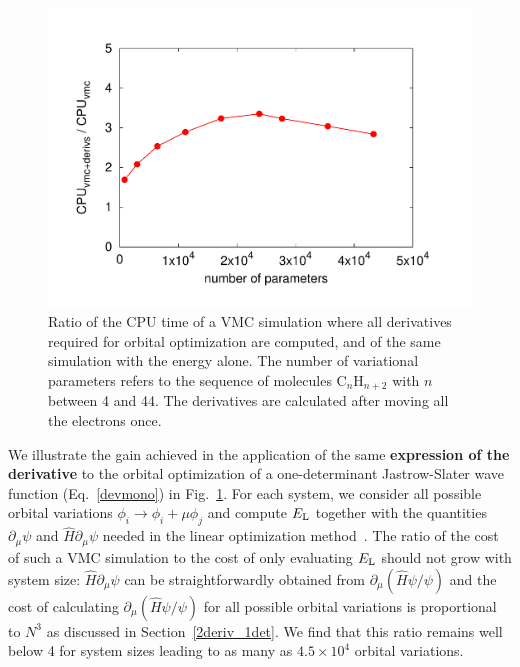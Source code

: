 \documentclass[aip,jcp,reprint,floatfix,onecolumn]{revtex4-1}
\begin{document}
\begin{figure}[h]
\includegraphics[width=\columnwidth]{aorb.pdf}
\caption{
Ratio of the CPU time of a VMC simulation where all derivatives required for orbital optimization are computed,
and of the same simulation with the energy alone. The number of variational parameters refers to the sequence of
molecules C$_n$H$_{n+2}$ with $n$ between 4 and 44. The derivatives are calculated after moving all the electrons once.
}
\label{orb_a}
\end{figure}

We illustrate the gain achieved in the application of the same %
{\bf expression of the derivative}  to the orbital optimization of a one-determinant
Jastrow-Slater wave function (Eq.~\ref{devmono}) in Fig.~\ref{orb_a}. For each system, we consider all possible orbital variations
$\phi_i \to \phi_i+\mu\phi_j$ and compute $E_{\rm L}$ together with the quantities $\partial_\mu\psi$ and
$\hat{H}\partial_\mu \psi$ needed in the linear optimization method~\cite{Umrigar07}.  The ratio of the cost of such a VMC simulation
to the cost of only evaluating $E_{\rm L}$ should not grow with system size: $\hat{H}\partial_\mu \psi$ can be straightforwardly
obtained from $\partial_\mu (\hat{H}\psi/\psi)$ and the cost of calculating $\partial_\mu (\hat{H}\psi/\psi)$ for all possible orbital
variations is proportional to $N^3$ as discussed in Section~\ref{2deriv_1det}. We find that this ratio remains well below 4 for system
sizes leading to as many as $4.5\times 10^4$ orbital variations.
\end{document}
